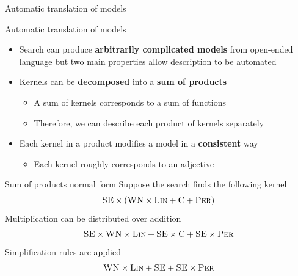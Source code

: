 \begin{frame}{Automatic translation of models}
  
\end{frame}

\begin{frame}{Automatic translation of models}
  \begin{itemize}
    \item Search can produce {\bf arbitrarily complicated models} from open-ended language but two main properties allow description to be automated
    \vspace{\baselineskip}
    \item Kernels can be {\bf decomposed} into a {\bf sum of products}
    \begin{itemize}
      \item A sum of kernels corresponds to a sum of functions
      \item Therefore, we can describe each product of kernels separately
    \end{itemize}
    \vspace{\baselineskip}
    \item Each kernel in a product modifies a model in a {\bf consistent} way
    \begin{itemize}
      \item Each kernel roughly corresponds to an adjective
    \end{itemize}
  \end{itemize}
\end{frame}

\begin{frame}{Sum of products normal form}
  Suppose the search finds the following kernel
  \begin{align*}
    {\textsc{SE}} \times ({\textsc{WN}} \times {\textsc{Lin}} + {\textsc{C}} + {\textsc{Per}})
  \end{align*}
  \pause
  Multiplication can be distributed over addition
  \begin{align*}
    {\textsc{SE}} \times {\textsc{WN}} \times {\textsc{Lin}} + {\textsc{SE}} \times {\textsc{C}} + {\textsc{SE}} \times {\textsc{Per}}
  \end{align*}
  \pause
  Simplification rules are applied
  \begin{align*}
    {\textsc{WN}} \times {\textsc{Lin}} + {\textsc{SE}} + {\textsc{SE}} \times {\textsc{Per}}
  \end{align*}
\end{frame}

